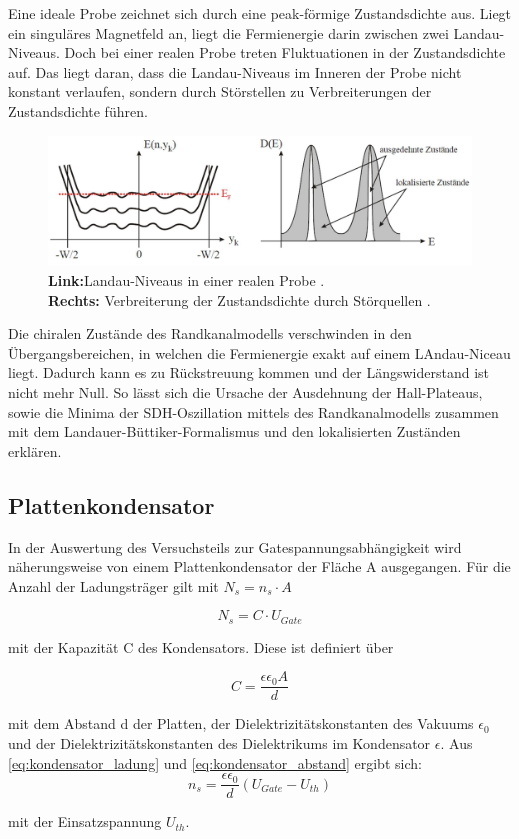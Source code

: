 Eine ideale Probe zeichnet sich durch eine peak-förmige Zustandsdichte aus. Liegt ein singuläres Magnetfeld an, liegt die Fermienergie darin zwischen zwei Landau-Niveaus. Doch bei einer realen Probe treten Fluktuationen in der Zustandsdichte auf. Das liegt daran, dass die Landau-Niveaus im Inneren der Probe nicht konstant verlaufen, sondern durch Störstellen zu Verbreiterungen der Zustandsdichte führen.

\begin{figure}[h]
\centering
\includegraphics[width=0.7\linewidth]{images/Anleitungsheft/fermi_landau_Anleitungsheft.png}
\caption[Struktur von Landau-Niveaus in realer Probe]{
	\textbf{Link:}Landau-Niveaus in einer realen Probe \cite{anleitung}.\\
	\textbf{Rechts:} Verbreiterung der Zustandsdichte durch Störquellen \cite{anleitung}.}
\label{fig:fermi_landau_Anleitungsheft}
\end{figure}

Die chiralen Zustände des Randkanalmodells verschwinden in den Übergangsbereichen, in welchen die Fermienergie exakt auf einem LAndau-Niceau liegt. Dadurch kann es zu Rückstreuung kommen und der Längswiderstand ist nicht mehr Null.  
So lässt sich die Ursache der Ausdehnung der Hall-Plateaus, sowie die Minima der SDH-Oszillation mittels des Randkanalmodells zusammen mit dem Landauer-Büttiker-Formalismus und den lokalisierten Zuständen erklären.


\subsection{Plattenkondensator}

In der Auswertung des Versuchsteils zur Gatespannungsabhängigkeit wird näherungsweise von einem Plattenkondensator der Fläche A ausgegangen. Für die Anzahl der Ladungsträger gilt mit $N_s=n_s \cdot A$ 

\begin{equation}
N_s=C \cdot U_{Gate}
\label{eq:kondensator_ladung}
\end{equation}

mit der Kapazität C des Kondensators. Diese ist definiert über

\begin{equation}
C=\frac{\epsilon \epsilon_0 A}{d}
\label{eq:kondensator_abstand}
\end{equation}

mit dem Abstand d der Platten, der Dielektrizitätskonstanten des Vakuums $\epsilon_0$ und der Dielektrizitätskonstanten des Dielektrikums im Kondensator $\epsilon$. 
Aus \ref{eq:kondensator_ladung} und \ref{eq:kondensator_abstand} ergibt sich:
\begin{equation}
n_s=\frac{\epsilon \epsilon_0}{d}(U_{Gate}-U_{th})
\label{eq:kondens_lad_und_abst}
\end{equation}

mit der Einsatzspannung $U_{th}$.
